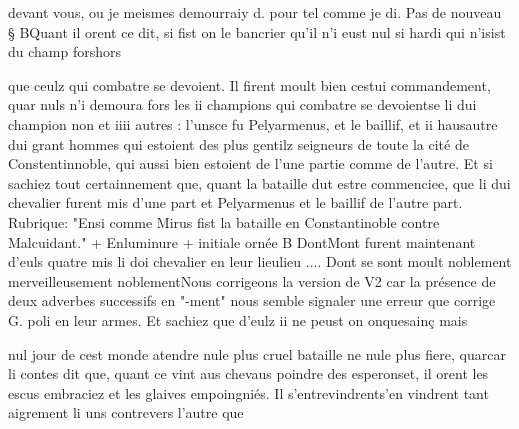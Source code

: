 \documentclass{article}
\begin{document}
\begin{pages}
                     devant vous, ou je meismes 
                     demourraiy d. pour tel comme je di. \pend
            \pstart Pas de nouveau § BQuant
               il orent ce dit, si fist on 
                  le bancrier qu’il n’i eust nul si hardi qui n’isist du champ 
                  forshors
               
                  que ceulz qui combatre se devoient. Il firent 
                  moult bien cestui commandement, quar nuls n’i demoura 
                  fors les ii champions 
                        qui combatre se devoientse li dui champion non et iiii autres : 
                  l’unsce fu Pelyarmenus, et le baillif, et 
                  ii hausautre dui grant hommes 
                  qui estoient des plus gentilz seigneurs de toute la cité de
                        Constentinnoble, qui aussi bien estoient de l’une partie comme de l’autre. 
                  Et si sachiez 
                        tout certainnement que, quant la bataille dut estre commenciee, que li dui
                     chevalier furent mis d’une part et Pelyarmenus et le baillif de
                     l’autre part. \pend
            Rubrique: "Ensi comme Mirus fist la bataille en Constantinoble
               contre Malcuidant." + Enluminure + initiale ornée B
            \pstart 
                  DontMont furent 
                  maintenant d’euls quatre mis li doi chevalier en leur 
                  lieulieu .... Dont se sont 
                  moult noblement
                  merveilleusement noblementNous corrigeons la version de V2 car la présence de
                  deux adverbes successifs en "-ment" nous semble signaler une erreur que corrige
                  G. poli en leur armes. Et sachiez que d’eulz ii ne peust on 
                  onquesainç mais
               
                  nul jour de cest monde atendre 
                  nule plus cruel bataille ne 
                  nule plus fiere, 
                  quarcar li contes dit que, quant ce vint aus chevaus poindre 
                  des esperonset, il orent les escus embraciez et les glaives empoingniés. Il 
                  s’entrevindrents'en vindrent tant aigrement li uns 
                  contrevers l’autre que 


\end{pages}
\end{document}
